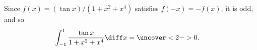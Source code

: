 \begin{frame}
\begin{example} %
Since $f(x) = (\tan x)/ (1 + x^2 + x^4) $ satisfies $f(-x) = -f(x)$, it is odd, and so
\abovedisplayskip=0pt
\belowdisplayskip=0pt
\begin{align*}
\int_{-1}^1 \frac{\tan x}{1+x^2+x^4} \diff x%
& = %
\uncover<2->{%
0.%
}%
\end{align*}
\end{example}
\end{frame}
